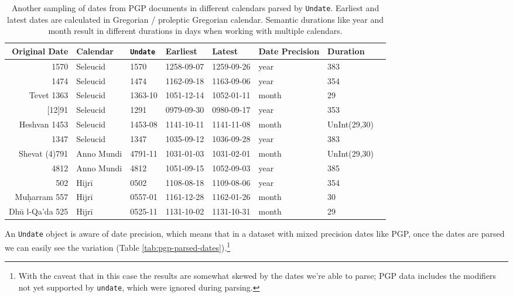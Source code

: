 \documentclass{anthology-ch}         %
\begin{document}
\begin{table}[h]
  \centering 
  \begin{tabular}{rlllllll}
    \toprule
Original Date & Calendar & \texttt{Undate} & Earliest & Latest & Date Precision & Duration \\ 
\midrule
1570 & Seleucid & 1570 & 1258-09-07 & 1259-09-26 & year & 383 \\
1474 & Seleucid & 1474 & 1162-09-18 & 1163-09-06 & year & 354 \\
Tevet 1363 & Seleucid & 1363-10 & 1051-12-14 & 1052-01-11 & month & 29 \\
{[12]91} & Seleucid & 1291 & 0979-09-30 & 0980-09-17 & year & 353 \\
Heshvan 1453 & Seleucid & 1453-08 & 1141-10-11 & 1141-11-08 & month & UnInt(29,30) \\
1347 & Seleucid & 1347 & 1035-09-12 & 1036-09-28 & year &  383 \\
\midrule
Shevat (4)791 & Anno Mundi & 4791-11 & 1031-01-03 & 1031-02-01 & month & UnInt(29,30) \\
4812 & Anno Mundi & 4812 & 1051-09-15 & 1052-09-03 & year & 385 \\
\midrule
502 & Hijrī & 0502 & 1108-08-18 & 1109-08-06 & year & 354 \\
Muḥarram 557 & Hijrī & 0557-01 & 1161-12-28 & 1162-01-26 & month & 30 \\
Dhū l-Qa'da 525 & Hijrī & 0525-11 & 1131-10-02 & 1131-10-31 & month & 29 \\
\bottomrule
    \bottomrule
  \end{tabular}
  \caption{Another sampling of dates from PGP documents in different calendars parsed by \texttt{Undate}. Earliest and latest dates are calculated in Gregorian / proleptic Gregorian calendar. Semantic durations like year and month result in different durations in days when working with multiple calendars.}
  \label{tab:pgp-date-durations}
\end{table}


An \texttt{Undate} object is aware of date precision, which means that in a dataset with mixed precision dates like PGP, once the dates are parsed we can easily see the variation (Table \ref{tab:pgp-parsed-dates}).\footnote{With the caveat that in this case the results are somewhat skewed by the dates we're able to parse; PGP data includes the modifiers not yet supported by \texttt{undate}, which were ignored during parsing.}
\end{document}
